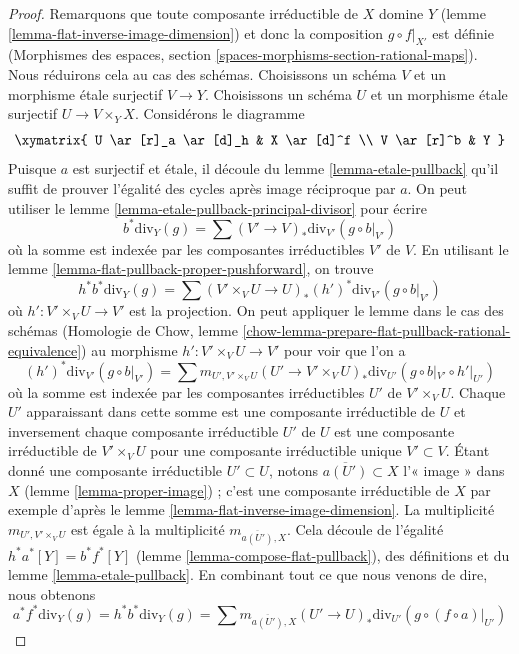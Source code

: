 \begin{proof}
Remarquons que toute composante irréductible de $X$ domine $Y$ (lemme
\ref{lemma-flat-inverse-image-dimension}) et donc la composition $g \circ
f|_{X'}$ est définie (Morphismes des espaces, section
\ref{spaces-morphisms-section-rational-maps}). Nous réduirons cela au cas des
schémas. Choisissons un schéma $V$ et un morphisme \'etale surjectif $V \to Y$.
Choisissons un schéma $U$ et un morphisme \'etale surjectif $U \to V \times_Y
X$. Considérons le diagramme $$
\xymatrix{
U \ar[r]_a \ar[d]_h & X \ar[d]^f \\
V \ar[r]^b & Y
}
$$
Puisque $a$ est surjectif et \'etale, il découle du lemme
\ref{lemma-etale-pullback} qu'il suffit de prouver l'égalité des cycles après
image réciproque par $a$. On peut utiliser le lemme
\ref{lemma-etale-pullback-principal-divisor} pour écrire
$$
b^*\text{div}_Y(g) = \sum (V' \to V)_*\text{div}_{V'}(g \circ b|_{V'})
$$
où la somme est indexée par les composantes irréductibles $V'$ de $V$. En utilisant le
lemme \ref{lemma-flat-pullback-proper-pushforward}, on trouve
$$
h^*b^*\text{div}_Y(g) =
\sum (V' \times_V U \to U)_*(h')^*\text{div}_{V'}(g \circ b|_{V'})
$$
où $h' : V' \times_V U \to V'$ est la projection. On peut appliquer le lemme
dans le cas des schémas (Homologie de Chow, lemme
\ref{chow-lemma-prepare-flat-pullback-rational-equivalence}) au morphisme $h'
: V' \times_V U \to V'$ pour voir que l'on a
$$
(h')^*\text{div}_{V'}(g \circ b|_{V'}) =
\sum
m_{U', V' \times_V U}
(U' \to V' \times_V U)_*\text{div}_{U'}(g \circ b|_{V'} \circ h'|_{U'})
$$
où la somme est indexée par les composantes irréductibles $U'$ de $V' \times_V U$.
Chaque $U'$ apparaissant dans cette somme est une composante irréductible de
$U$ et inversement chaque composante irréductible $U'$ de $U$ est une
composante irréductible de $V' \times_V U$ pour une composante irréductible
unique $V' \subset V$. Étant donné une composante irréductible $U' \subset U$,
notons $\overline{a(U')} \subset X$ l'« image » dans $X$ (lemme
\ref{lemma-proper-image}) ; c'est une composante irréductible de $X$ par
exemple d'après le lemme \ref{lemma-flat-inverse-image-dimension}. La multiplicité
$m_{U', V' \times_V U}$ est égale à la multiplicité $m_{\overline{a(U')}, X}$.
Cela découle de l'égalité $h^*a^*[Y] = b^*f^*[Y]$ (lemme
\ref{lemma-compose-flat-pullback}), des définitions et du lemme
\ref{lemma-etale-pullback}. En combinant tout ce que nous venons de dire, nous
obtenons
$$
a^*f^*\text{div}_Y(g) =
h^*b^*\text{div}_Y(g) =
\sum m_{\overline{a(U')}, X}
(U' \to U)_*\text{div}_{U'}(g \circ (f \circ a)|_{U'})
$$
\end{proof}
